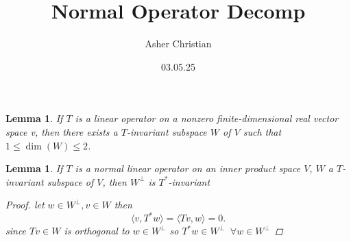 \documentclass{article}
\title{Normal Operator Decomp}
\author{Asher Christian}
\date{ 03.05.25}
\newtheorem{lemma}[theorem]{Lemma} %
\begin{document}
    \maketitle
    \begin{lemma}\label{lem:pick_2d}
        If $T$ is a linear operator on a nonzero finite-dimensional real
        vector space v, then there exists a  $T$-invariant subspace $W$ of $V$ such that
        $1 \le \dim(W) \le 2$.
    \end{lemma}
    \begin{lemma}\label{lem:perp}
        If $T$ is a normal linear operator on an inner product space $V$, $W$ a $T$-invariant
        subspace of $V$, then $W^{\perp}$ is $T^{*}$-invariant
        \begin{proof}
            let $w \in W^{\perp}, v \in W$ then
            \[
            \langle v, T^{*}w \rangle = \langle Tv, w \rangle = 0
            .\]
            since $Tv \in W$ is orthogonal to $w \in W^{\perp}$ so $T^{*}w \in W^{\perp} \;\; \forall w \in W^{\perp}$ 
        \end{proof}
    \end{lemma}
\end{document}
